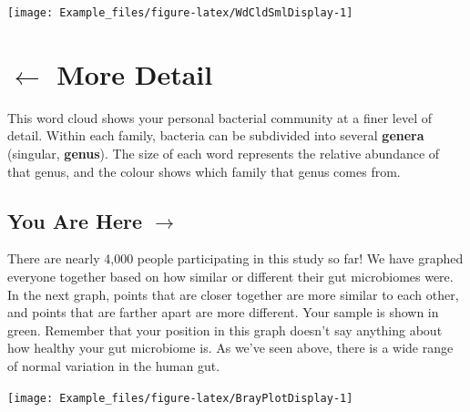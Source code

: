 \documentclass[
]{article}
\begin{document}
\begin{multicols}{2}
\raggedcolumns

\begin{center}\texttt{[image: Example\_files/figure-latex/WdCldSmlDisplay-1]} \end{center}

\columnbreak

\vspace*{1cm}
\section{$\boldsymbol{\leftarrow}$ More Detail}
\begin{small}
This word cloud shows your personal bacterial community at a finer 
level of detail. Within each family, bacteria can be subdivided into 
several \textbf{genera} (singular, \textbf{genus}). The size of each word
represents the relative abundance of that genus, and the colour shows
which family that genus comes from.
\end{small}
\vspace*{\fill}

\end{multicols}

\begin{multicols}{2}
\raggedcolumns

\vspace*{\fill}
\section{You Are Here $\boldsymbol{\rightarrow}$}
\begin{small}
There are nearly 4,000 people participating in this study so far! We have 
graphed everyone together based on how similar or different their gut
microbiomes were. In the next graph, points that are closer together
are more similar to each other, and points that are farther apart are
more different. Your sample is shown in green. Remember that your 
position in this graph doesn't say anything about how healthy your
gut microbiome is. As we've seen above, there is a wide range of 
normal variation in the human gut.
\end{small}

\vspace*{\fill}
\columnbreak

\vspace*{1cm}

\begin{center}\texttt{[image: Example\_files/figure-latex/BrayPlotDisplay-1]} \end{center}

\vspace*{\fill}

\end{multicols}
\end{document}
